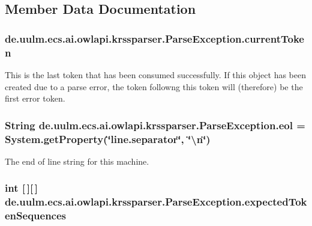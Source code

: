 \subsection{Member Data Documentation}
\hypertarget{classde_1_1uulm_1_1ecs_1_1ai_1_1owlapi_1_1krssparser_1_1_parse_exception_a8e87575c92870b9a4d13e7fa62a49664}{
\subsubsection[{current\-Token}]{ de.\-uulm.\-ecs.\-ai.\-owlapi.\-krssparser.\-Parse\-Exception.\-current\-Token}}\label{classde_1_1uulm_1_1ecs_1_1ai_1_1owlapi_1_1krssparser_1_1_parse_exception_a8e87575c92870b9a4d13e7fa62a49664}
This is the last token that has been consumed successfully. If this object has been created due to a parse error, the token followng this token will (therefore) be the first error token. \hypertarget{classde_1_1uulm_1_1ecs_1_1ai_1_1owlapi_1_1krssparser_1_1_parse_exception_ab9d9a6de5fe3ec6a97673fb7bebc1396}{
\subsubsection[{eol}]{\setlength{\rightskip}{0pt plus 5cm}String de.\-uulm.\-ecs.\-ai.\-owlapi.\-krssparser.\-Parse\-Exception.\-eol = System.\-get\-Property(\char`\"{}line.\-separator\char`\"{}, \char`\"{}\textbackslash{}n\char`\"{})\hspace{0.3cm}{\ttfamily [protected]}}}\label{classde_1_1uulm_1_1ecs_1_1ai_1_1owlapi_1_1krssparser_1_1_parse_exception_ab9d9a6de5fe3ec6a97673fb7bebc1396}
The end of line string for this machine. \hypertarget{classde_1_1uulm_1_1ecs_1_1ai_1_1owlapi_1_1krssparser_1_1_parse_exception_a0bd006134d3ed9aba2fca16a4865924d}{
\subsubsection[{expected\-Token\-Sequences}]{\setlength{\rightskip}{0pt plus 5cm}int \mbox{[}$\,$\mbox{]}\mbox{[}$\,$\mbox{]} de.\-uulm.\-ecs.\-ai.\-owlapi.\-krssparser.\-Parse\-Exception.\-expected\-Token\-Sequences}}\label{classde_1_1uulm_1_1ecs_1_1ai_1_1owlapi_1_1krssparser_1_1_parse_exception_a0bd006134d3ed9aba2fca16a4865924d}
